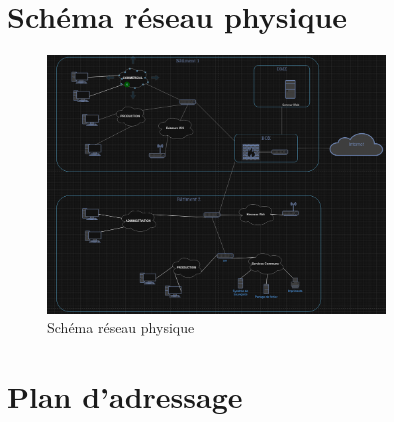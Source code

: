 \documentclass[a4paper,12pt,openany]{report}
\begin{document}
        \section{Schéma réseau physique}
            \begin{figure}
                \centering
                \includegraphics[width=0.8\textwidth]{Images/Schema_physique.png}
                \caption{Schéma réseau physique}
            \end{figure}
        \section{Plan d'adressage}
\end{document}
